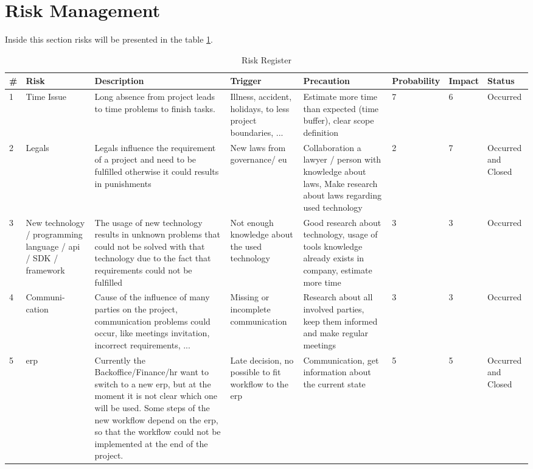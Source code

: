 \section{Risk Management}
Inside this section risks will be presented in the table \ref{fig:risks}.
\begin{center}
	\begin{landscape}
		\begin{table}[h]
			\begin{tabular}{|p{}|p{2.5cm}|p{5cm}|p{4cm}|p{4cm}|p{1,5cm}|p{}|p{}|} \hline
				\rowcolor{Gray} \# & Risk & Description & Trigger & Precaution & Probability & Impact & Status \\ \hline
				1 & Time Issue & Long absence from project leads to time problems to finish tasks. & Illness, accident, holidays, to less project boundaries, ... & Estimate more time than expected (time buffer), clear scope definition & 7 & 6 & Occurred \\ \hline
				2 & Legals & Legals influence the requirement of a project and need to be fulfilled otherwise it could results in punishments & New laws from governance/ \gls{eu} & Collaboration a lawyer / person with knowledge about laws, Make research about laws regarding used technology & 2 & 7 & Occurred and Closed \\ \hline
				3 & New technology / programming language / \gls{api} / \gls{SDK} / framework & The usage of new technology results	in unknown problems that could not be solved with that technology due to the fact that requirements could not be fulfilled & Not enough knowledge about 	the used technology & Good research about technology, usage of tools knowledge already exists in company, estimate more time & 3 & 3 & Occurred \\ \hline
				4 & Communi- cation & Cause of the influence of many parties on the project, communication problems could occur, like meetings invitation, incorrect requirements, ... & Missing or incomplete communication & Research about all involved parties, keep them informed and make regular meetings & 3 & 3 & Occurred \\ \hline
				5 & \Gls{erp} & Currently the Backoffice/Finance/\gls{hr} want to switch to a new \gls{erp},
				but at the moment it is not clear which	one will be used. Some steps of	the new workflow depend on the \gls{erp}, so that the workflow could not be implemented at the end	of the project. & Late decision, no possible to fit workflow to the \gls{erp} & Communication, get information about the current state & 5 & 5 & Occurred and Closed \\ \hline
			\end{tabular}
			\caption{Risk Register}
			\label{fig:risks}
		\end{table}
	\end{landscape}
\end{center}
